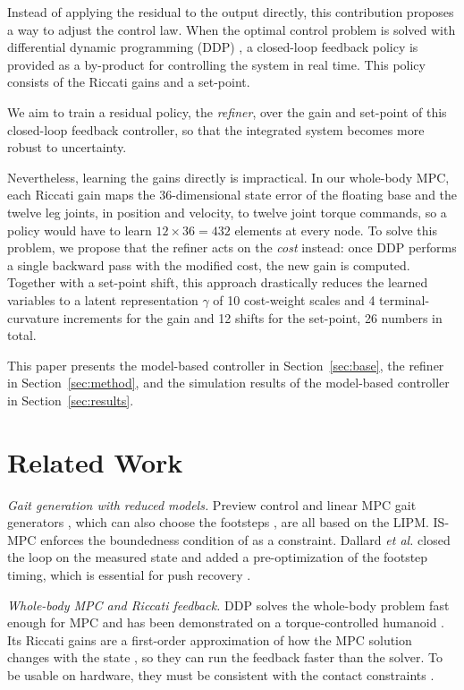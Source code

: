 \documentclass[conference]{IEEEtran}
\begin{document}
Instead of applying the residual to the output directly, this contribution proposes a way to adjust the control law.
When the optimal control problem is solved with differential dynamic programming (DDP) \cite{mayne1966ddp}, a closed-loop feedback policy is provided as a by-product for controlling the system in real time.
This policy consists of the Riccati gains and a set-point.

We aim to train a residual policy, the \emph{refiner}, over the gain and set-point of this closed-loop feedback controller, so that the integrated system becomes more robust to uncertainty.

Nevertheless, learning the gains directly is impractical. In our whole-body MPC, each Riccati gain maps the 36-dimensional state error of the floating base and the twelve leg joints, in position and velocity, to twelve joint torque commands, so a policy would have to learn $12\times36=432$ elements at every node.
To solve this problem, we propose that the refiner acts on the \emph{cost} instead: once DDP performs a single backward pass with the modified cost, the new gain is computed. Together with a set-point shift, this approach drastically reduces the learned variables to a latent representation $\gamma$ of 10 cost-weight scales and 4 terminal-curvature increments for the gain and 12 shifts for the set-point, 26 numbers in total.

This paper presents the model-based controller in Section~\ref{sec:base}, the refiner in Section~\ref{sec:method}, and the simulation results of the model-based controller in Section~\ref{sec:results}.

\section{Related Work}

\emph{Gait generation with reduced models.}
Preview control \cite{kajita2003preview} and linear MPC gait generators \cite{wieber2006mpc}, which can also choose the footsteps \cite{herdt2010online}, are all based on the LIPM.
IS-MPC \cite{scianca2020ismpc} enforces the boundedness condition of \cite{lanari2014boundedness} as a constraint.
Dallard \emph{et al.} \cite{dallard2025adios} closed the loop on the measured state and added a pre-optimization of the footstep timing, which is essential for push recovery \cite{khadiv2020timing}.

\emph{Whole-body MPC and Riccati feedback.}
DDP \cite{mayne1966ddp,li2004ilqr,tassa2012synthesis} solves the whole-body problem fast enough for MPC and has been demonstrated on a torque-controlled humanoid \cite{dantec2022wbmpc}.
Its Riccati gains are a first-order approximation of how the MPC solution changes with the state \cite{dantec2022firstorder}, so they can run the feedback faster than the solver.
To be usable on hardware, they must be consistent with the contact constraints \cite{grandia2019feedback}.
\end{document}
